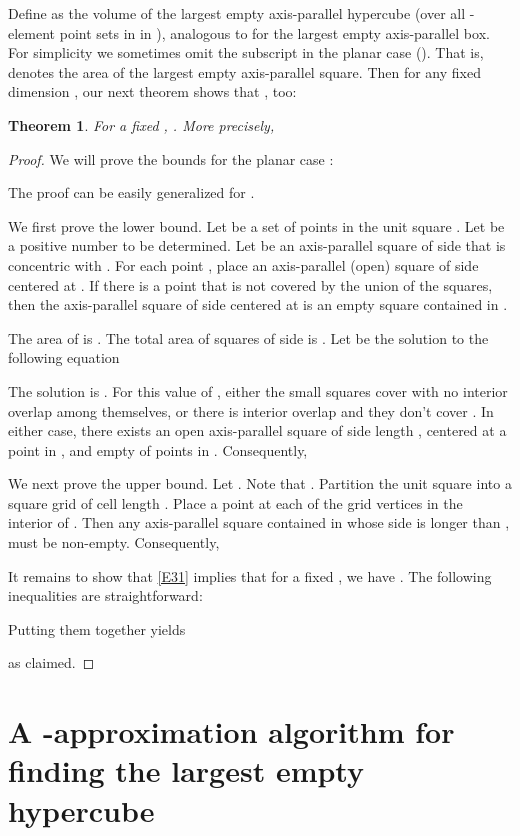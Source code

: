 \documentclass[11pt]{article}
\newtheorem{theorem}{Theorem}
\begin{document}
Define  as the volume of the largest empty axis-parallel
hypercube (over all -element point sets in in ), analogous
to  for the largest empty axis-parallel box.  
For simplicity we sometimes omit the subscript  in the planar case
().  That is,  denotes the area of the largest empty 
axis-parallel square. Then for any fixed dimension , our next
theorem shows that , too: 

\begin{theorem} \label{T5}
For a fixed , . 
More precisely,

\end{theorem}
\begin{proof}
We will prove the bounds for the planar case :

The proof can be easily generalized for .

We first prove the lower bound. Let  be a set of  points in the unit
square . Let  be a positive number to be determined. Let  be
an axis-parallel square of side  that is concentric with . For
each point , place an axis-parallel (open) square of side 
centered at . If there is a point  that is not covered by the
union of the  squares, then the axis-parallel square of side 
centered at  is an empty square contained in .

The area of  is . The total area of  squares of side
 is . Let  be the solution to the following equation

The solution is . For this value of , 
either the  small squares cover  with no interior overlap among
themselves, or there is interior overlap and they don't cover . In
either case, there exists an open axis-parallel square of side length
, centered at a point in , and empty of points in . Consequently,  



We next prove the upper bound. Let . Note
that . Partition the unit square  into a 
square grid of cell length . Place a point at each of the 
grid vertices in the interior of . Then any axis-parallel square
contained in  whose side is longer than , must be
non-empty. Consequently, 



It remains to show that \eqref{E31} implies that for a fixed , 
we have .
The following inequalities are straightforward:


Putting them together yields

as claimed.
\end{proof}


\section{A -approximation algorithm for finding the largest
empty \\ hypercube}\label{sec:approx2}  
\end{document}
